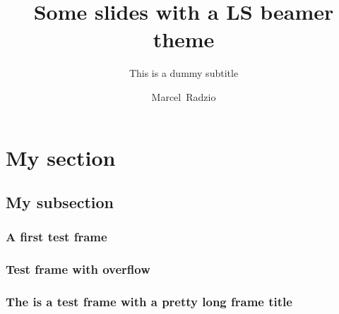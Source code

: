 \documentclass[pdflatex,compress]{beamer}
\title{Some slides with a LS beamer theme}
\subtitle{This is a dummy subtitle}
\author{Marcel~Radzio}
\begin{document}
\maketitle

\section{My section}
\subsection{My subsection}

\begin{frame}
\frametitle{A first test frame}
\lipsum[1]
\end{frame}

\begin{frame}
\frametitle{Test frame with overflow}
\lipsum%
\end{frame}


\begin{frame}
\frametitle{The is a test frame with a pretty long frame title}
\lipsum
\end{frame}
\end{document}
